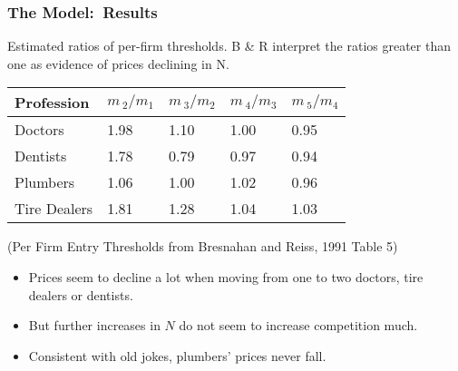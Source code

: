 \begin{frame}%

\frametitle{The Model:\ Results}

Estimated ratios of per-firm thresholds. B \& R interpret the ratios greater
than one as evidence of prices declining in N.

\begin{center}
\begin{tabular}{|l|l|l|l|l|}
\hline
Profession & $m\,_{2}/m_{1}$ & $m\,_{3}/m_{2}$ & $m\,_{4}/m_{3}$ & $%
m\,_{5}/m_{4}$ \\ \hline
Doctors & 1.98 & 1.10 & 1.00 & 0.95 \\ \hline
Dentists & 1.78 & 0.79 & 0.97 & 0.94 \\ \hline
Plumbers & 1.06 & 1.00 & 1.02 & 0.96 \\ \hline
Tire Dealers & 1.81 & 1.28 & 1.04 & 1.03 \\ \hline
\end{tabular}
\end{center}

(Per Firm Entry Thresholds from Bresnahan and Reiss, 1991 Table 5\bigskip )

\begin{itemize}
\item Prices seem to decline a lot when moving from one to two doctors, tire
dealers or dentists.

\item But further increases in $N$ do not seem to increase competition much.

\item Consistent with old jokes, plumbers' prices never fall.
\end{itemize}

\end{frame}%

